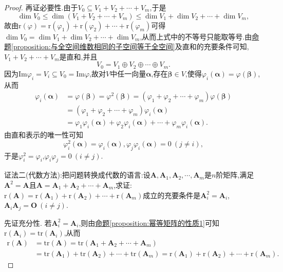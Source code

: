 \documentclass[../../main.tex]{subfiles}%
\begin{document}
\begin{proof}
再证必要性.由于\(V_0\subseteq V_1 + V_2+\cdots+V_m\),于是
\[
\dim V_0\leqslant \dim(V_1 + V_2+\cdots+V_m)\leqslant \dim V_1+\dim V_2+\cdots+\dim V_m,
\]
故由\(\text{r}(\varphi)=\text{r}(\varphi_1)+\text{r}(\varphi_2)+\cdots+\text{r}(\varphi_m)\)可得\(\dim V_0=\dim V_1+\dim V_2+\cdots+\dim V_m\),从而上式中的不等号只能取等号.由\hyperref[proposition:与全空间维数相同的子空间等于全空间]{命题\ref{proposition:与全空间维数相同的子空间等于全空间}}及直和的充要条件可知,\(V_1 + V_2+\cdots+V_m\)是直和,并且
\[
V_0 = V_1\oplus V_2\oplus\cdots\oplus V_m.
\]
因为\(\text{Im}\varphi_i = V_i\subseteq V_0 = \text{Im}\varphi\),故对\(V\)中任一向量\(\boldsymbol{\alpha}\),存在\(\boldsymbol{\beta}\in V\),使得\(\varphi_i(\boldsymbol{\alpha})=\varphi(\boldsymbol{\beta})\),从而
\begin{align*}
\varphi_i(\boldsymbol{\alpha})&=\varphi(\boldsymbol{\beta})=\varphi^2(\boldsymbol{\beta})=(\varphi_1+\varphi_2+\cdots+\varphi_m)\varphi(\boldsymbol{\beta})\\
&=(\varphi_1+\varphi_2+\cdots+\varphi_m)\varphi_i(\boldsymbol{\alpha})\\
&=\varphi_1\varphi_i(\boldsymbol{\alpha})+\varphi_2\varphi_i(\boldsymbol{\alpha})+\cdots+\varphi_m\varphi_i(\boldsymbol{\alpha}).
\end{align*}
由直和表示的唯一性可知
\[
\varphi_i^2(\boldsymbol{\alpha})=\varphi_i(\boldsymbol{\alpha}),\varphi_j\varphi_i(\boldsymbol{\alpha}) = 0\ (j\neq i),
\]
于是\(\varphi_i^2 = \varphi_i\),\(\varphi_i\varphi_j = 0\ (i\neq j)\).

{\color{blue}证法二(代数方法):}把问题转换成代数的语言:设\(\boldsymbol{A},\boldsymbol{A}_1,\boldsymbol{A}_2,\cdots,\boldsymbol{A}_m\)是\(n\)阶矩阵,满足\(\boldsymbol{A}^2 = \boldsymbol{A}\)且\(\boldsymbol{A}=\boldsymbol{A}_1+\boldsymbol{A}_2+\cdots+\boldsymbol{A}_m\),求证:\(\text{r}(\boldsymbol{A})=\text{r}(\boldsymbol{A}_1)+\text{r}(\boldsymbol{A}_2)+\cdots+\text{r}(\boldsymbol{A}_m)\)成立的充要条件是\(\boldsymbol{A}_i^2 = \boldsymbol{A}_i\),\(\boldsymbol{A}_i\boldsymbol{A}_j = \boldsymbol{O}\ (i\neq j)\).

先证充分性. 若\(\boldsymbol{A}_i^2 = \boldsymbol{A}_i\),则由\hyperref[proposition:幂等矩阵的性质1]{命题\ref{proposition:幂等矩阵的性质1}}可知\(\text{r}(\boldsymbol{A}_i)=\text{tr}(\boldsymbol{A}_i)\),从而
\begin{align*}
\text{r}(\boldsymbol{A})&=\text{tr}(\boldsymbol{A})=\text{tr}(\boldsymbol{A}_1+\boldsymbol{A}_2+\cdots+\boldsymbol{A}_m)\\
&=\text{tr}(\boldsymbol{A}_1)+\text{tr}(\boldsymbol{A}_2)+\cdots+\text{tr}(\boldsymbol{A}_m)=\text{r}(\boldsymbol{A}_1)+\text{r}(\boldsymbol{A}_2)+\cdots+\text{r}(\boldsymbol{A}_m).
\end{align*}


\end{proof}
\end{document}
